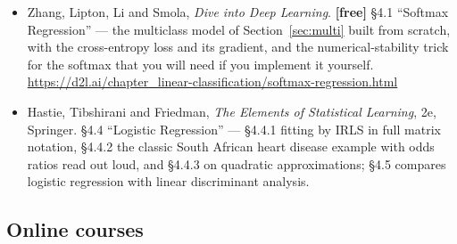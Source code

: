 \documentclass[11pt]{article}
\begin{document}
\begin{itemize}[leftmargin=*]
    Section~\ref{sec:gradient}; Ch.~7 for convexity, which is what
    Section~\ref{sec:concave} is an instance of; §9.2 for the maximum
    likelihood framing shared with Lecture~9.
    \url{https://mml-book.github.io/}
  \item Zhang, Lipton, Li and Smola, \emph{Dive into Deep Learning}.
    \textbf{[free]} §4.1 ``Softmax Regression'' --- the multiclass model of
    Section~\ref{sec:multi} built from scratch, with the cross-entropy loss
    and its gradient, and the numerical-stability trick for the softmax that
    you will need if you implement it yourself.
    \url{https://d2l.ai/chapter_linear-classification/softmax-regression.html}
  \item Hastie, Tibshirani and Friedman, \emph{The Elements of Statistical
    Learning}, 2e, Springer. §4.4 ``Logistic Regression'' --- §4.4.1 fitting
    by IRLS in full matrix notation, §4.4.2 the classic South African heart
    disease example with odds ratios read out loud, and §4.4.3 on quadratic
    approximations; §4.5 compares logistic regression with linear discriminant
    analysis.
\end{itemize}

\subsection*{Online courses}
\end{document}
